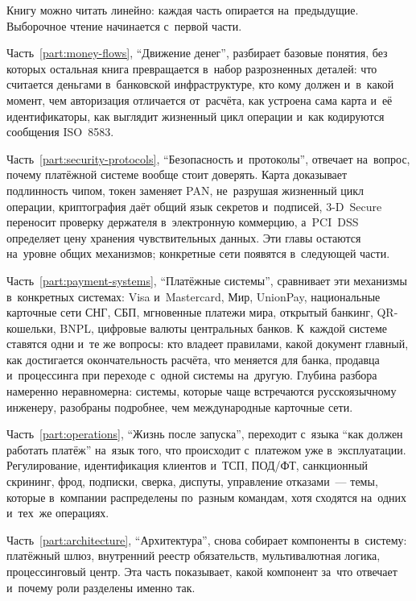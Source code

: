 

Книгу можно читать линейно: каждая часть опирается на~предыдущие. Выборочное
чтение начинается с~первой части.

Часть~\ref{part:money-flows}, \enquote{Движение денег}, разбирает базовые
понятия, без которых остальная книга превращается в~набор разрозненных деталей:
что считается деньгами в~банковской инфраструктуре, кто кому должен и~в~какой
момент, чем авторизация отличается от~расчёта, как устроена сама карта и~её
идентификаторы, как выглядит жизненный цикл операции и~как кодируются сообщения
ISO~8583.

Часть~\ref{part:security-protocols}, \enquote{Безопасность и~протоколы},
отвечает на~вопрос, почему платёжной системе вообще стоит доверять. Карта
доказывает подлинность чипом, токен заменяет PAN, не~разрушая жизненный цикл
операции, криптография даёт общий язык секретов и~подписей, 3-D~Secure
переносит проверку держателя в~электронную коммерцию, а~PCI~DSS определяет цену
хранения чувствительных данных. Эти главы остаются на~уровне общих механизмов;
конкретные сети появятся в~следующей части.

Часть~\ref{part:payment-systems}, \enquote{Платёжные системы}, сравнивает эти
механизмы в~конкретных системах: Visa и~Mastercard, Мир, UnionPay, национальные
карточные сети СНГ, СБП, мгновенные платежи мира, открытый банкинг,
QR-кошельки, BNPL, цифровые валюты центральных банков. К~каждой системе
ставятся одни и~те же вопросы: кто владеет правилами, какой документ главный,
как достигается окончательность расчёта, что меняется для банка, продавца
и~процессинга при переходе с~одной системы на~другую. Глубина разбора
намеренно неравномерна: системы, которые чаще встречаются русскоязычному инженеру,
разобраны подробнее, чем международные карточные сети.

Часть~\ref{part:operations}, \enquote{Жизнь после запуска}, переходит с~языка
\enquote{как должен работать платёж} на~язык того, что происходит с~платежом
уже в~эксплуатации. Регулирование, идентификация клиентов и~ТСП, ПОД/ФТ, санкционный
скрининг, фрод, подписки, сверка, диспуты, управление отказами~--- темы,
которые в~компании распределены по~разным командам, хотя сходятся на~одних
и~тех~же операциях.

Часть~\ref{part:architecture}, \enquote{Архитектура}, снова собирает
компоненты в~систему: платёжный шлюз, внутренний реестр обязательств,
мультивалютная логика, процессинговый центр. Эта часть показывает, какой
компонент за~что отвечает и~почему роли разделены именно так.

